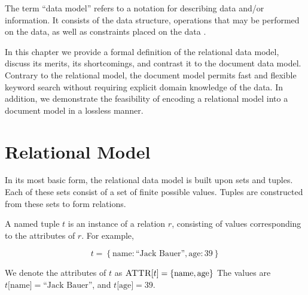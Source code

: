 The term ``data model'' refers to a notation for describing data and/or information.  It consists of the data structure, operations that may be performed on the data, as well as constraints placed on the data \cite{dbsys-06}.

In this chapter we provide a formal definition of the relational data model, discuss its merits, its shortcomings, and contrast it to the document data model.  Contrary to the relational model, the document model permits fast and flexible keyword search without requiring explicit domain knowledge of the data.  In addition, we demonstrate the feasibility of encoding a relational model into a document model in a lossless manner.

\section{Relational Model}
	In its most basic form, the relational data model is built upon sets and tuples.  Each of these sets consist of a set of finite possible values.  Tuples are constructed from these sets to form relations.
	
	\begin{defn}
	\label{def:named-tuple}
		A named tuple $t$ is an instance of a relation $r$, consisting of values corresponding to the attributes of $r$.  For example,
		
		$$t = \left\{\mathrm{name}: \textrm{``Jack Bauer''}, \mathrm{age}: 39\right\}$$
		
		We denote the attributes of $t$ as $\textsc{ATTR}\lbrack t\rbrack = \left\{\mathrm{name}, \mathrm{age}\right\}$  The values are $t\lbrack \mathrm{name}\rbrack = \textrm{``Jack Bauer''}$, and $t\lbrack \mathrm{age}\rbrack = 39$.
	\end{defn}
	
